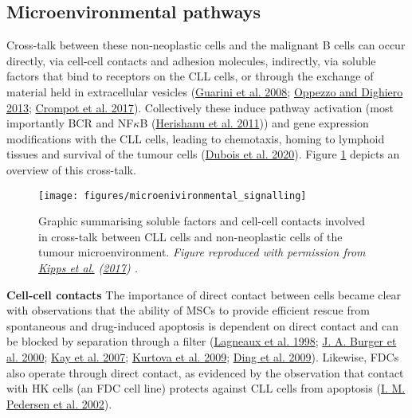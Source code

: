 \documentclass[11pt, a4paper, twosided]{book}
\begin{document}
\hypertarget{intro-microenvironmental-pathways}{%
\subsection{Microenvironmental pathways}\label{intro-microenvironmental-pathways}}

Cross-talk between these non-neoplastic cells and the malignant B cells can occur directly, via cell-cell contacts and adhesion molecules, indirectly, via soluble factors that bind to receptors on the CLL cells, or through the exchange of material held in extracellular vesicles (\protect\hyperlink{ref-Guarini2008}{Guarini et al. 2008}; \protect\hyperlink{ref-Oppezzo2013}{Oppezzo and Dighiero 2013}; \protect\hyperlink{ref-Crompot2017}{Crompot et al. 2017}). Collectively these induce pathway activation (most importantly BCR and NF\(\kappa\)B (\protect\hyperlink{ref-Herishanu2011}{Herishanu et al. 2011})) and gene expression modifications with the CLL cells, leading to chemotaxis, homing to lymphoid tissues and survival of the tumour cells (\protect\hyperlink{ref-Dubois2020}{Dubois et al. 2020}). Figure \ref{fig:microenvironmentSignalling} depicts an overview of this cross-talk.


\begin{figure}

{\centering \texttt{[image: figures/microenivironmental\_signalling]} 

}

\caption{Graphic summarising soluble factors and cell-cell contacts involved in cross-talk between CLL cells and non-neoplastic cells of the tumour microenvironment. \emph{Figure reproduced with permission from \protect\hyperlink{ref-Kipps2017}{Kipps et al.} (\protect\hyperlink{ref-Kipps2017}{2017}) .}}\label{fig:microenvironmentSignalling}
\end{figure}
\textbf{Cell-cell contacts}
The importance of direct contact between cells became clear with observations that the ability of MSCs to provide efficient rescue from spontaneous and drug-induced apoptosis is dependent on direct contact and can be blocked by separation through a filter (\protect\hyperlink{ref-Lagneaux1998}{Lagneaux et al. 1998}; \protect\hyperlink{ref-Burger2000}{J. A. Burger et al. 2000}; \protect\hyperlink{ref-Kay2007}{Kay et al. 2007}; \protect\hyperlink{ref-Kurtova2009}{Kurtova et al. 2009}; \protect\hyperlink{ref-Ding2009}{Ding et al. 2009}). Likewise, FDCs also operate through direct contact, as evidenced by the observation that contact with HK cells (an FDC cell line) protects against CLL cells from apoptosis (\protect\hyperlink{ref-Pedersen2002}{I. M. Pedersen et al. 2002}).
\end{document}
